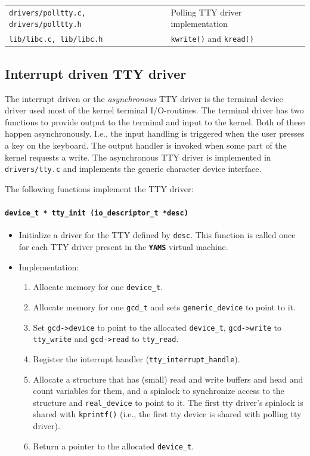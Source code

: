\documentclass[twoside,a4paper]{report}
\makeatletter
\newcommand{\PBS}[1]{\let\temp=\\#1\let\\=\temp}
\newlength{\tablewidth}
\newenvironment{function}[3]{%
\paragraph{\texttt{#1 {\textbf{#2}} (#3)}}%
\index{#2@\texttt{#2}}%
\begin{itemize}%
}{%
\end{itemize}%
}
\newcommand{\yams}{\texttt{\textbf{YAMS}}}
\newenvironment{filelist}[0]{%
\vspace{\baselineskip}%
\begin{center}%
\begin{tabular}{p{4cm}>{\PBS\raggedright}p{\tablewidth-4\tabcolsep-4cm}}%
\hline%
}{%
\end{tabular}%
\end{center}%
}
\newcommand{\file}[2]{\texttt{#1} \vspace{2mm} & #2 \vspace{2mm}\\}
\makeatother
\begin{document}
\begin{filelist}
\file{drivers/polltty.c, drivers/polltty.h}{Polling TTY driver implementation}
\file{lib/libc.c, lib/libc.h}{\texttt{kwrite()} and \texttt{kread()}}
\end{filelist}


\subsection{Interrupt driven TTY driver}


The interrupt driven or the \emph{asynchronous} TTY driver is the
terminal device driver used most of the kernel terminal I/O-routines.
The terminal driver has two functions to provide output to the terminal
and input to the kernel. Both of these happen asynchronously. I.e.,
the input handling is triggered when the user presses a key on the
keyboard. The output handler is invoked when some part of the kernel
requests a write. The asynchronous TTY driver is implemented in
\texttt{drivers/tty.c} and implements the generic character device
interface.

The following functions implement the TTY driver:

\begin{function}{device\_t *}{tty\_init}{io\_descriptor\_t *desc}
\item Initialize a driver for the TTY defined by \texttt{desc}.
  This function is called once for each TTY driver present in the \yams{}
  virtual machine.

\item Implementation:
\begin{enumerate}
\item Allocate memory for one \texttt{device\_t}.

\item Allocate memory for one \texttt{gcd\_t} and sets
\texttt{generic\_device} to point to it.

\item Set \texttt{gcd->device} to point to the allocated
\texttt{device\_t}, \texttt{gcd->write} to \texttt{tty\_write} and
\texttt{gcd->read} to \texttt{tty\_read}.

\item Register the interrupt handler (\texttt{tty\_interrupt\_handle}).

\item Allocate a structure that has (small) read and write buffers and
head and count variables for them, and a spinlock to synchronize
access to the structure and \texttt{real\_device} to point to it. The
first tty driver's spinlock is shared with \texttt{kprintf()} (i.e.,
the first tty device is shared with polling tty driver).

\item Return a pointer to the allocated \texttt{device\_t}.
\end{enumerate}
\end{function}
\end{document}
